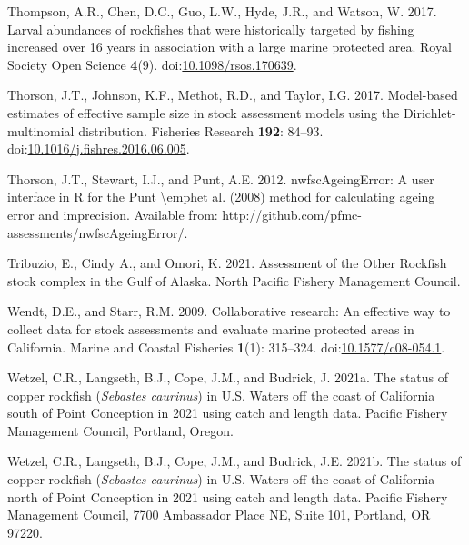 \documentclass[11pt,
  english,
  letterpaper,
]{article}
\newlength{\cslhangindent}
\newenvironment{CSLReferences}[2] %
 {%
  \setlength{\parindent}{0pt}
  \ifodd #1 \everypar{\setlength{\hangindent}{\cslhangindent}}\ignorespaces\fi
  \ifnum #2 > 0
  \setlength{\parskip}{#2\baselineskip}
  \fi
 }%
 {}
\begin{document}
\begin{CSLReferences}{1}{0}
\leavevmode{}%
Thompson, A.R., Chen, D.C., Guo, L.W., Hyde, J.R., and Watson, W. 2017. Larval abundances of rockfishes that were historically targeted by fishing increased over 16 years in association with a large marine protected area. Royal Society Open Science \textbf{4}(9). doi:\href{https://doi.org/10.1098/rsos.170639}{10.1098/rsos.170639}.

\leavevmode{}%
Thorson, J.T., Johnson, K.F., Methot, R.D., and Taylor, I.G. 2017. Model-based estimates of effective sample size in stock assessment models using the {Dirichlet}-multinomial distribution. Fisheries Research \textbf{192}: 84--93. doi:\href{https://doi.org/10.1016/j.fishres.2016.06.005}{10.1016/j.fishres.2016.06.005}.

\leavevmode{}%
Thorson, J.T., Stewart, I.J., and Punt, A.E. 2012. {nwfscAgeingError}: A user interface in {R} for the {Punt} {\textbackslash{}}emphet al. (2008) method for calculating ageing error and imprecision. Available from: http://github.com/pfmc-assessments/nwfscAgeingError/.

\leavevmode{}%
Tribuzio, E., Cindy A., and Omori, K. 2021. Assessment of the {Other} {Rockfish} stock complex in the {Gulf} of {Alaska}. North Pacific Fishery Management Council.

\leavevmode{}%
Wendt, D.E., and Starr, R.M. 2009. Collaborative research: An effective way to collect data for stock assessments and evaluate marine protected areas in {California}. Marine and Coastal Fisheries \textbf{1}(1): 315--324. doi:\href{https://doi.org/10.1577/c08-054.1}{10.1577/c08-054.1}.

\leavevmode{}%
Wetzel, C.R., Langseth, B.J., Cope, J.M., and Budrick, J. 2021a. The status of copper rockfish (\emph{{Sebastes} caurinus}) in {U}.{S}. Waters off the coast of {California} south of {Point} {Conception} in 2021 using catch and length data. Pacific Fishery Management Council, Portland, Oregon.

\leavevmode{}%
Wetzel, C.R., Langseth, B.J., Cope, J.M., and Budrick, J.E. 2021b. The status of copper rockfish (\emph{{Sebastes} caurinus}) in {U}.{S}. Waters off the coast of {California} north of {Point} {Conception} in 2021 using catch and length data. Pacific Fishery Management Council, 7700 Ambassador Place NE, Suite 101, Portland, OR 97220.


\end{CSLReferences}
\end{document}
